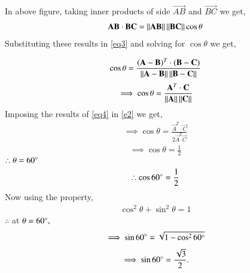 \documentclass[journal,12pt,twocolumn]{IEEEtran}
\begin{document}
In above figure, taking inner products of side $\vec{AB}$ and $\vec{BC}$ we get,
\begin{align}
\mathbf{AB}\cdot\mathbf{BC} = \left\lVert\mathbf{AB}\right\rVert\left\lVert\mathbf{BC}\right\rVert\cos\theta
\label{eq3}
\end{align}
Substituting these results in \eqref{eq3} and solving for $\cos\theta$ we get,

\begin{comment}
\begin{align}
\cos\theta  = \brak{\frac{\norm{\vec{a}}^2 + \norm{\vec{b}}^2 - \norm{\vec{a}+\vec{b}}^2}{2\norm{\vec{a}}\norm{\vec{b}}}}
\end{align}
\end{comment}
\begin{align}
\cos\theta = \frac{(\mathbf{A}-\mathbf{B})^T\cdot(\mathbf{B}-\mathbf{C})}{\left\lVert\mathbf{A}-\mathbf{B}\right\rVert\left\lVert\mathbf{B}-\mathbf{C}\right\rVert}
\end{align}
\begin{align}
\implies \cos\theta = \frac{\mathbf{A}^T\cdot\mathbf{C}}{\left\lVert\mathbf{A}\right\rVert\left\lVert\mathbf{C}\right\rVert}
\label{e2}
\end{align}
Imposing the results of \eqref{eq4} in \eqref{e2} we get,
\begin{align}
\implies \cos\theta = \frac{\vec{A}^T\cdot\vec{C}}{2\vec{A}^T\vec{C}}
\end{align}
\begin{align}
\implies \cos\theta = \frac{1}{2}
\end{align}
$\therefore \theta = 60\degree$
\begin{align}
\therefore \cos60\degree = \frac{1}{2}
\end{align}
Now using the property,
\begin{align}
\cos^2\theta +\sin^2\theta = 1
\end{align} 
$\therefore$ at $\theta = 60\degree, $
\begin{align}
\implies \sin60\degree = \sqrt{1-\cos^260\degree}
\end{align}
\begin{align}
\implies\sin60\degree = \frac{\sqrt{3}}{2}.
\end{align}
\end{document}
